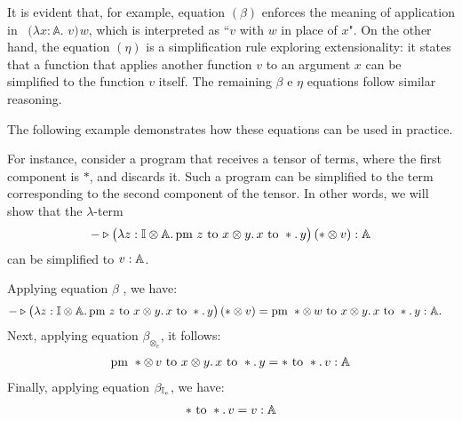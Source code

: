 It is evident that, for example, equation $(\beta)$ enforces the meaning of application in  $(\lambda x : \mathbb{A}.$ $v) \hspace{1pt} w $, which is interpreted as ``$v$ with $w$ in place of $x$".
On the other hand, the equation $(\eta)$ is a simplification rule exploring extensionality: it states that a function that applies another function $v$ to an argument $x$ can be simplified to the function $v$ itself. 
The remaining $\beta$ e $\eta$ equations follow similar reasoning.

The following example demonstrates how these equations can be used in practice.

\begin{example} \label{ex:eq_contex_gen}
  For instance, consider a program that receives a tensor of terms, where the first component is $*$, and discards it. Such a program can be simplified to the term corresponding to the second component of the tensor. In other words, we will show that the $\lambda$-term
\[
 - \triangleright \big(\lambda z : \mathbb{I} \otimes \mathbb{A}.\, \text{pm } z \text{ to } x \otimes y.\, x \text{ to } *.\, y\big)\, (* \otimes v) : \mathbb{A}
\]
can be simplified to $v : \mathbb{A}$.

Applying equation $\beta$ , we have:
\begin{equation*}
  \begin{split}
 - \triangleright \big(\lambda z : \mathbb{I} \otimes \mathbb{A}. \, \text{pm } z \text{ to } x \otimes y. \, x \text{ to } *.\, y \big) \, (* \otimes  v) 
&= \text{pm }  * \otimes \, w \text{ to } x \otimes y. \, x \text{ to } *.\, y  : \mathbb{A}. 
 \end{split}
\end{equation*}
Next, applying  equation $\beta_{\otimes_e}$, it follows:
\begin{align*}
\text{pm }  * \otimes \, v \text{ to } x \otimes y. \, x \text{ to } *.\, y  
=   * \text{ to } *.\, v: \mathbb{A}
\end{align*}
Finally, applying  equation $\beta_{\mathbb{I}_e}$, we have:
\begin{align*}
 * \text{ to } *.\, v = v: \mathbb{A}
\end{align*}

\end{example}





\begin{comment}
\begin{definition}
  Let \( S \) be a set. A \emph{relation} on \( S \) is a subset \( R \subseteq S \times S \). An ordered pair \( (s_1, s_2) \in R \) means that \( s_1 \) is related to \( s_2 \).
\end{definition}
\end{comment}

